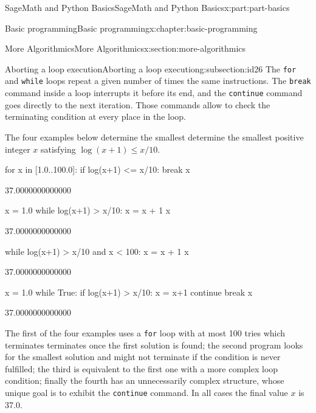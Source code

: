 \documentclass[oneside,10pt,]{book}
\newcommand{\mono}[1]{\texttt{#1}}
\numberwithin{equation}{section}
\begin{document}
\begin{partptx}{SageMath and Python Basics}{}{SageMath and Python Basics}{}{}{x:part:part-basics}
\begin{chapterptx}{Basic programming}{}{Basic programming}{}{}{x:chapter:basic-programming}
\begin{sectionptx}{More Algorithmics}{}{More Algorithmics}{}{}{x:section:more-algorithmics}
\typeout{************************************************}
%
\begin{subsectionptx}{Aborting a loop execution}{}{Aborting a loop execution}{}{}{g:subsection:id26}
The \mono{for} and \mono{while} loops repeat a given number of times the same instructions. The \mono{break} command inside a loop interrupts it before its end, and the \mono{continue} command goes directly to the next iteration.  Those commands allow to check the terminating condition at every place in the loop.%
\par
The four examples below determine the smallest determine the smallest positive integer \(x\) satisfying \(\log(x+1)\le x/10\).%
\begin{sageinput}
for x in [1.0..100.0]:
	if log(x+1) <= x/10:
		break
x
\end{sageinput}
\begin{sageoutput}
37.0000000000000
\end{sageoutput}
\begin{sageinput}
x = 1.0
while log(x+1) > x/10:
  		x = x + 1
x
\end{sageinput}
\begin{sageoutput}
37.0000000000000
\end{sageoutput}
\begin{sageinput}
while log(x+1) > x/10 and x < 100:
  		x = x + 1
x
\end{sageinput}
\begin{sageoutput}
37.0000000000000
\end{sageoutput}
\begin{sageinput}
x = 1.0
while True:
	if log(x+1) > x/10:
		x = x+1
		continue
	break
x
\end{sageinput}
\begin{sageoutput}
37.0000000000000
\end{sageoutput}
The first of the four examples uses a \mono{for} loop with at most 100 tries which terminates terminates once the first solution is found; the second program looks for the smallest solution and might not terminate if the condition is never fulfilled; the third is equivalent to the first one with a more complex loop condition; finally the fourth has an unnecessarily complex structure, whose unique goal is to exhibit the \mono{continue} command. In all cases the final value \(x\) is 37.0.%
\end{subsectionptx}
%
%
\typeout{************************************************}
\typeout{************************************************}

\end{sectionptx}
\end{chapterptx}
\end{partptx}
\end{document}
